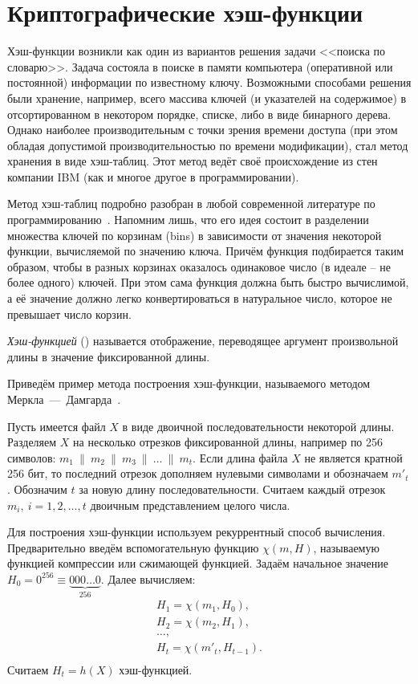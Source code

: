 \chapter{Криптографические хэш-функции}\label{chapter-hash-functions}

Хэш-функции возникли как один из вариантов решения задачи <<поиска по словарю>>. Задача состояла в поиске в памяти компьютера (оперативной или постоянной) информации по известному ключу. Возможными способами решения были хранение, например, всего массива ключей (и указателей на содержимое) в отсортированном в некотором порядке, списке, либо в виде бинарного дерева. Однако наиболее производительным с точки зрения времени доступа (при этом обладая допустимой производительностью по времени модификации), стал метод хранения в виде хэш-таблиц. Этот метод ведёт своё происхождение из стен компании IBM (как и многое другое в программировании).

Метод хэш-таблиц подробно разобран в любой современной литературе по программированию~\cite{Knuth:2001:3}. Напомним лишь, что его идея состоит в разделении множества ключей по корзинам (bins) в зависимости от значения некоторой функции, вычисляемой по значению ключа. Причём функция подбирается таким образом, чтобы в разных корзинах оказалось одинаковое число (в идеале -- не более одного) ключей. При этом сама функция должна быть быстро вычислимой, а её значение должно легко конвертироваться в натуральное число, которое не превышает число корзин.

\emph{Хэш-функцией} () называется отображение, переводящее аргумент произвольной длины в значение фиксированной длины.

\example
Приведём пример метода построения хэш-функции, называемого методом Меркла~---~Дамгарда~\cite{Merkle:1979, Merkle:1990, Damgard:1990}.

Пусть имеется файл $X$ в виде двоичной последовательности некоторой длины. Разделяем $X$ на несколько отрезков фиксированной длины, например по 256 символов:  $m_{1} ~\|~ m_{2} ~\|~ m_{3} ~\|~ \ldots ~\|~ m_{t}$. Если длина файла $X$ не является кратной 256 бит, то последний отрезок дополняем нулевыми символами и обозначаем $m'_{t}$.
Обозначим $t$ за новую длину последовательности. Считаем каждый отрезок $m_i, ~ i = 1, 2, \dots, t$ двоичным представлением целого числа.

Для построения хэш-функции используем рекуррентный способ вычисления. Предварительно введём вспомогательную функцию $\chi(m, H)$, называемую функцией компрессии или сжимающей функцией. Задаём начальное значение $H_{0} = 0^{256} \equiv \underbrace{000 \ldots 0}_{256} $. Далее вычисляем:
\[ \begin{array}{l}
    H_1 = \chi( m_1, H_0), \\
    H_2 = \chi( m_2, H_1), \\
    \dots,\\
    H_t = \chi( m'_t, H_{t-1}). \\
\end{array} \]
Считаем $H_{t} = h(X)$ хэш-функцией.
\exampleend

